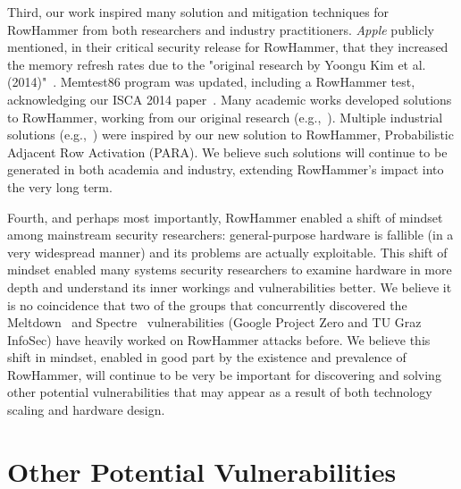 \documentclass[runningheads]{llncs}
\begin{document}
Third, our work inspired many solution and mitigation techniques for
RowHammer from both researchers and industry practitioners. {\em
  Apple} publicly mentioned, in their critical security release for
RowHammer, that they increased the memory refresh rates due to the
"original research by Yoongu Kim et
al. (2014)"~\cite{rh-apple}. Memtest86 program was updated, including
a RowHammer test, acknowledging our ISCA 2014
paper~\cite{rh-passmark}. Many academic works developed solutions to
RowHammer, working from our original research
(e.g.,~\cite{anvil,moin-rowhammer,anotherflip,seyedzadeh2017counter,brasser2016can,irazoqui2016mascat,son2017making,gomez2016dram,van2018guardion,lee2018twice}). Multiple
industrial solutions (e.g.,~\cite{x210-github,x210-rh-ss}) were
inspired by our new solution to RowHammer, Probabilistic Adjacent Row
Activation (PARA). We believe such solutions will continue to be generated in both academia and industry, extending RowHammer's impact into the very long term.

Fourth, and perhaps most importantly, RowHammer enabled a shift of
mindset among mainstream security researchers: general-purpose
hardware is fallible (in a very widespread manner) and its problems
are actually exploitable. This shift of mindset enabled many systems
security researchers to examine hardware in more depth and understand
its inner workings and vulnerabilities better. We believe it is no
coincidence that two of the groups that concurrently discovered the
Meltdown~\cite{lipp2018meltdown} and Spectre~\cite{kocher2018spectre}
vulnerabilities (Google Project Zero and TU Graz InfoSec) have heavily
worked on RowHammer attacks before. We believe this shift in mindset,
enabled in good part by the existence and prevalence of RowHammer,
will continue to be very be important for discovering and solving
other potential vulnerabilities that may appear as a result of both
technology scaling and hardware design.


\section{Other Potential Vulnerabilities}
\end{document}

